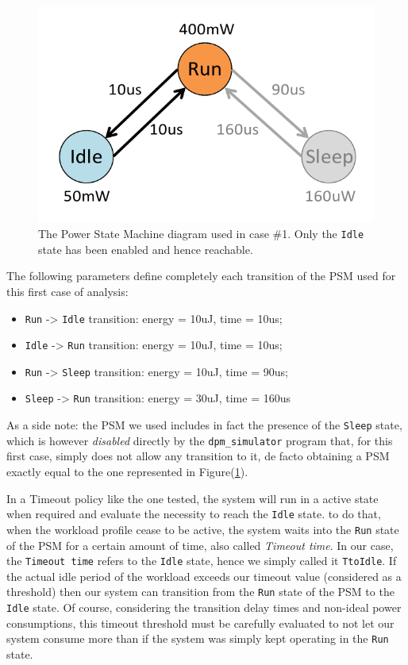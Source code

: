 \documentclass[a4paper]{article}
\begin{document}
            \begin{figure}[htp]
                \centering
                \includegraphics[width=0.4 \columnwidth]{./screenshots/PSM_case1.png}
                \caption{
                        \label{fig:PSM_case1}
                        The Power State Machine diagram used in case \#1. Only the \texttt{Idle} state has been enabled and hence reachable.
                }
            \end{figure}

            The following parameters define completely each transition of the PSM used for this first case of analysis:
            \begin{itemize}
                \item \texttt{Run} -> \texttt{Idle} transition: energy  = 10uJ, time = 10us;
                \item \texttt{Idle} -> \texttt{Run} transition: energy  = 10uJ, time = 10us;
                \item \texttt{Run} -> \texttt{Sleep} transition: energy  = 10uJ, time = 90us;
                \item \texttt{Sleep} -> \texttt{Run} transition: energy  = 30uJ, time = 160us
            \end{itemize}

            As a side note: the PSM we used includes in fact the presence of the \texttt{Sleep} state, which is however \emph{disabled} directly by the \texttt{dpm\_simulator} program that, for this first case, simply does not allow any transition to it, de facto obtaining a PSM exactly equal to the one represented in Figure(\ref{fig:PSM_case1}).

            In a Timeout policy like the one tested, the system will run in a active state when required and evaluate the necessity to reach the \texttt{Idle} state. to do that, when the workload profile cease to be active, the system waits into the \texttt{Run} state of the PSM for a certain amount of time, also called \emph{Timeout time}. In our case, the \texttt{Timeout time} refers to the \texttt{Idle} state, hence we simply called it \texttt{TtoIdle}. If the actual idle period of the workload exceeds our timeout value (considered as a threshold) then our system can transition from the \texttt{Run} state of the PSM to the \texttt{Idle} state. Of course, considering the transition delay times and non-ideal power consumptions, this timeout threshold must be carefully evaluated to not let our system consume more than if the system was simply kept operating in the \texttt{Run} state.
\end{document}
